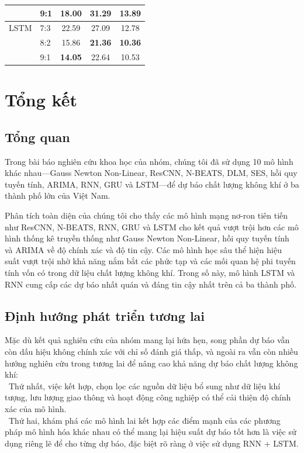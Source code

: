 \documentclass[conference]{IEEEtran}
\begin{document}
\begin{table}[ht]
\begin{tabular}{|l|l|c|c|c|}
                               & 9:1                         & \textbf{18.00}            & \textbf{31.29}                 & \textbf{13.89}           \\ \hline
        LSTM                   & 7:3                         & 22.59                     & 27.09                          & 12.78                    \\ \cline{2-5}
                               & 8:2                         & 15.86                     & \textbf{21.36}                 & \textbf{10.36}           \\ \cline{2-5}
                               & 9:1                         & \textbf{14.05}            & 22.64                          & 10.53                    \\ \hline
    \end{tabular}
\end{table}


\section{Tổng kết}
\subsection{Tổng quan}
Trong bài báo nghiên cứu khoa học của nhóm, chúng tôi đã sử dụng 10 mô hình khác nhau—Gauss Newton Non-Linear, ResCNN, N-BEATS, DLM, SES, hồi quy tuyến tính, ARIMA, RNN, GRU và LSTM—để dự báo chất lượng không khí ở ba thành phố lớn của Việt Nam.

Phân tích toàn diện của chúng tôi cho thấy các mô hình mạng nơ-ron tiên tiến như ResCNN, N-BEATS, RNN, GRU và LSTM cho kết quả vượt trội hơn các mô hình thống kê truyền thống như Gauss Newton Non-Linear, hồi quy tuyến tính và ARIMA về độ chính xác và độ tin cậy. Các mô hình học sâu thể hiện hiệu suất vượt trội nhờ khả năng nắm bắt các phức tạp và các mối quan hệ phi tuyến tính vốn có trong dữ liệu chất lượng không khí. Trong số này, mô hình LSTM và RNN cung cấp các dự báo nhất quán và đáng tin cậy nhất trên cả ba thành phố.
\subsection{Định hướng phát triển tương lai}
Mặc dù kết quả nghiên cứu của nhóm mang lại hứa hẹn, song phần dự báo vẫn còn dấu hiệu không chính xác với chỉ số đánh giá thấp, và ngoài ra vẫn còn nhiều hướng nghiên cứu trong tương lai để nâng cao khả năng dự báo chất lượng không khí:\\
\indent\textbullet\ Thứ nhất, việc kết hợp, chọn lọc các nguồn dữ liệu bổ sung như dữ liệu khí tượng, lưu lượng giao thông và hoạt động công nghiệp có thể cải thiện độ chính xác của mô hình.\\
\indent\textbullet\ Thứ hai, khám phá các mô hình lai kết hợp các điểm mạnh của các phương pháp mô hình hóa khác nhau có thể mang lại hiệu suất dự báo tốt hơn là việc sử dụng riêng lẽ để cho từng dự báo, đặc biệt rõ ràng ở việc sử dụng RNN + LSTM.
\end{document}
